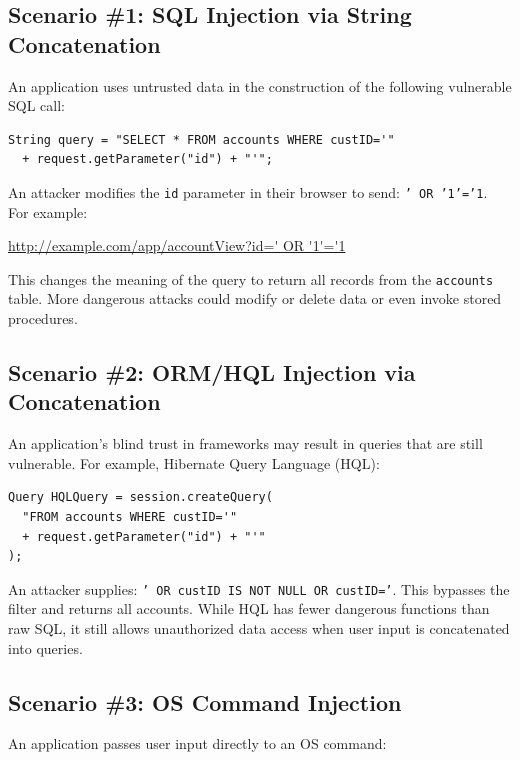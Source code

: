 \documentclass[11pt]{article}
\begin{document}
\subsection{Scenario \#1: SQL Injection via String Concatenation}
An application uses untrusted data in the construction of the following vulnerable SQL call:

\begin{codebox}
\begin{verbatim}
String query = "SELECT * FROM accounts WHERE custID='"
  + request.getParameter("id") + "'";
\end{verbatim}
\end{codebox}

An attacker modifies the \texttt{id} parameter in their browser to send:
\texttt{' OR '1'='1}. For example:

\begin{infobox}
\url{http://example.com/app/accountView?id=' OR '1'='1}
\end{infobox}

This changes the meaning of the query to return all records from the \texttt{accounts} table. More dangerous attacks could modify or delete data or even invoke stored procedures.

\subsection{Scenario \#2: ORM/HQL Injection via Concatenation}
An application's blind trust in frameworks may result in queries that are still vulnerable. For example, Hibernate Query Language (HQL):

\begin{codebox}
\begin{verbatim}
Query HQLQuery = session.createQuery(
  "FROM accounts WHERE custID='"
  + request.getParameter("id") + "'"
);
\end{verbatim}
\end{codebox}

An attacker supplies: \texttt{' OR custID IS NOT NULL OR custID='}. This bypasses the filter and returns all accounts. While HQL has fewer dangerous functions than raw SQL, it still allows unauthorized data access when user input is concatenated into queries.

\subsection{Scenario \#3: OS Command Injection}
An application passes user input directly to an OS command:
\end{document}
